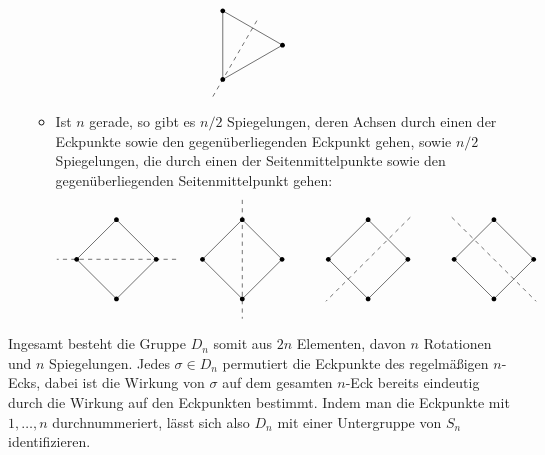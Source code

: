 \begin{itemize}
\begin{itemize}
\[\begin{tikzpicture}
            \draw ([xshift=18em]0:1)
            \foreach \x in {120, 240, 360} {
              -- ([xshift=18em]\x:1)
            };
            \foreach \x in {120, 240, 360} {
              \fill[black] ([xshift=18em]\x:1) circle (0.06);
            }
            \draw[dashed] ([xshift=18em]240:1.5) -- ([xshift=18em]60:0.8);
          \end{tikzpicture}
          \hspace{5em}
        \]
      \item
        Ist $n$ gerade, so gibt es $n/2$ Spiegelungen, deren Achsen durch einen der Eckpunkte sowie den gegenüberliegenden Eckpunkt gehen, sowie $n/2$ Spiegelungen, die durch einen der Seitenmittelpunkte sowie den gegenüberliegenden Seitenmittelpunkt gehen:
        \[
          \begin{tikzpicture}
            \draw (0:1)
            \foreach \x in {90, 180, 270, 360} {
              -- (\x:1)
            };
            \foreach \x in {90, 180, 270, 360} {
              \fill[black] (\x:1) circle (0.06);
            }
            \draw[dashed] (0:1.5) -- (180:1.5);
            \draw ([xshift=9em]0:1)
            \foreach \x in {90, 180, 270, 360} {
              -- ([xshift=9em]\x:1)
            };
            \foreach \x in {90, 180, 270, 360} {
              \fill[black] ([xshift=9em]\x:1) circle (0.06);
            }
            \draw[dashed] ([xshift=9em]90:1.5) -- ([xshift=9em]270:1.5);
            \draw ([xshift=27em]0:1)
            \foreach \x in {90, 180, 270, 360} {
              -- ([xshift=27em]\x:1)
            };
            \foreach \x in {90, 180, 270, 360} {
              \fill[black] ([xshift=27em]\x:1) circle (0.06);
            }
            \draw[dashed] ([xshift=27em]135:1.5) -- ([xshift=27em]315:1.5);
            \draw ([xshift=18em]0:1)
            \foreach \x in {90, 180, 270, 360} {
              -- ([xshift=18em]\x:1)
            };
            \foreach \x in {90, 180, 270, 360} {
              \fill[black] ([xshift=18em]\x:1) circle (0.06);
            }
            \draw[dashed] ([xshift=18em]45:1.5) -- ([xshift=18em]225:1.5);
          \end{tikzpicture}
        \]
    \end{itemize}
\end{itemize}

Ingesamt besteht die Gruppe $D_n$ somit aus $2n$ Elementen, davon $n$ Rotationen und $n$ Spiegelungen.
Jedes $\sigma \in D_n$ permutiert die Eckpunkte des regelmäßigen $n$-Ecks, dabei ist die Wirkung von $\sigma$ auf dem gesamten $n$-Eck bereits eindeutig durch die Wirkung auf den Eckpunkten bestimmt.
Indem man die Eckpunkte mit $1, \dotsc, n$ durchnummeriert, lässt sich also $D_n$ mit einer Untergruppe von $S_n$ identifizieren.

